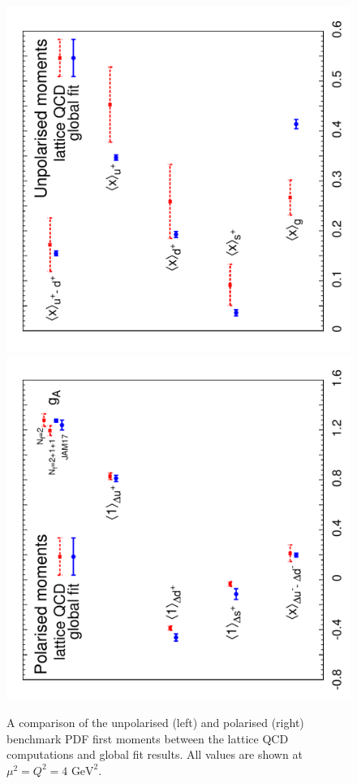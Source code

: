 \begin{figure}[!t]
\centering
\includegraphics[scale=0.44,angle=270]{plots/unpmoms}
\includegraphics[scale=0.44,angle=270]{plots/polmoms}\\
\caption{\small A comparison of the unpolarised (left) and polarised (right) 
benchmark PDF first moments between the lattice QCD computations and global fit results.
%
All values are shown at $\mu^2=Q^2=4\mbox{ GeV}^2$.}
\label{fig:Bmoms}
\end{figure}

